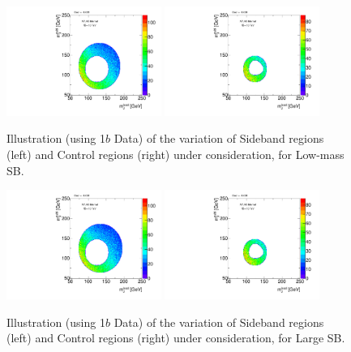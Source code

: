 \begin{figure}[htbp!]
\begin{center}
\includegraphics[angle=270, width=0.45\textwidth]{./figures/boosted/Syst_CRSB/SB_Low_Sideband_OneTag_mH0H1.pdf}
\includegraphics[angle=270, width=0.45\textwidth]{./figures/boosted/Syst_CRSB/SB_Low_Control_OneTag_mH0H1.pdf}\\
\end{center}
\caption{Illustration (using 1$b$ Data) of the variation of Sideband regions (left) and Control regions (right) under consideration, for Low-mass SB.}
\label{CRSB:SB_Low}
\end{figure}

\begin{figure}[htbp!]
\begin{center}
\includegraphics[angle=270, width=0.45\textwidth]{./figures/boosted/Syst_CRSB/SB_Large_Sideband_OneTag_mH0H1.pdf}
\includegraphics[angle=270, width=0.45\textwidth]{./figures/boosted/Syst_CRSB/SB_Large_Control_OneTag_mH0H1.pdf}\\
\end{center}
\caption{Illustration (using 1$b$ Data) of the variation of Sideband regions (left) and Control regions (right) under consideration, for Large SB.}
\label{CRSB:SB_Large}
\end{figure}

